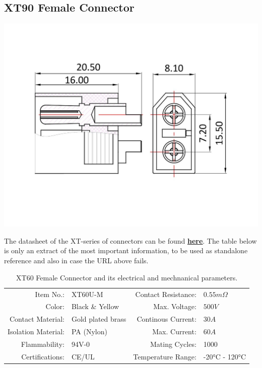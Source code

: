 \clearpage %

\subsection{XT90 Female Connector}

\includegraphics[width=\textwidth]{contents/figures/xt60_m.jpg}

The datasheet of the XT-series of connectors can be found \href{https://www.lcsc.com/datasheet/lcsc_datasheet_1810251322_Changzhou-Amass-Elec-XT60_C98733.pdf}{\textbf{\underline{here}}}.
The table below is only an extract of the most important information, to be used as standalone reference and also in case the URL above fails.

\begin{table}[h] %
    \begin{tabular}{rlrl}
         Item No.:&  XT60U-M &  Contact Resistance:& $0.55m \Omega$\\
         Color:&  Black \& Yellow&  Max. Voltage:& $500V$\\
         Contact Material:&  Gold plated brass&  Continous Current:& $30A$\\
         Isolation Material:&  PA (Nylon)&  Max. Current:& $60A$\\
         Flammability:&  94V-0&  Mating Cycles:& 1000\\
         Certifications:&  CE/UL&  Temperature Range:& -20°C - 120°C\\
    \end{tabular}
    \caption{XT60 Female Connector and its electrical and mechnanical parameters.}
    \label{tab:xt60_f_specs}
\end{table}

\clearpage %
